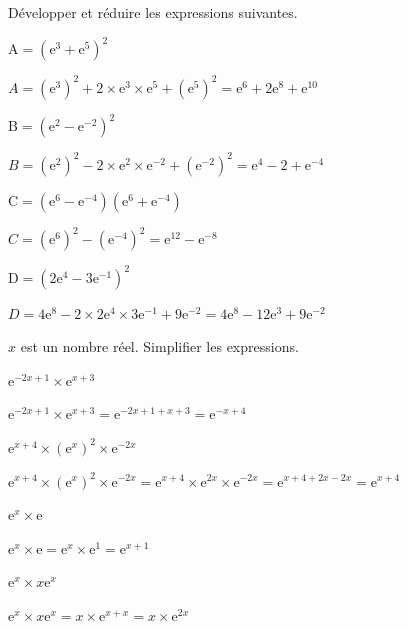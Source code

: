\documentclass[11pt,a4paper]{article}  %
\begin{document}
Développer et réduire les expressions suivantes.
\begin{enumMet}
	\item $\mathrm{A}=\left(\mathrm{e}^3+\mathrm{e}^5\right)^2$
	\begin{corrBox}
		$A=\left(\mathrm{e}^3\right)^2+2 \times \mathrm{e}^3 \times \mathrm{e}^5+\left(\mathrm{e}^5\right)^2=\mathrm{e}^6+2 \mathrm{e}^8+\mathrm{e}^{10}$
	\end{corrBox}
	\item $\mathrm{B}=\left(\mathrm{e}^2-\mathrm{e}^{-2}\right)^2$
	\begin{corrBox}
		$B=\left(\mathrm{e}^2\right)^2-2 \times \mathrm{e}^2 \times \mathrm{e}^{-2}+\left(\mathrm{e}^{-2}\right)^2=\mathrm{e}^4-2+\mathrm{e}^{-4}$
	\end{corrBox}
	\item  $\mathrm{C}=\left(\mathrm{e}^6-\mathrm{e}^{-4}\right)\left(\mathrm{e}^6+\mathrm{e}^{-4}\right)$
	\begin{corrBox}
		$C=\left(\mathrm{e}^6\right)^2-\left(\mathrm{e}^{-4}\right)^2=\mathrm{e}^{12}-\mathrm{e}^{-8}$
	\end{corrBox}
	\item $\mathrm{D}=\left(2 \mathrm{e}^4-3 \mathrm{e}^{-1}\right)^2$
	\begin{corrBox}
		$D=4 \mathrm{e}^8-2 \times 2 \mathrm{e}^4 \times 3 \mathrm{e}^{-1}+9 \mathrm{e}^{-2}=4 \mathrm{e}^8-12 \mathrm{e}^3+9 \mathrm{e}^{-2}$
	\end{corrBox}
\end{enumMet}


$x$ est un nombre réel. Simplifier les expressions.
\begin{enumMet}
	\item $\mathrm{e}^{-2 x+1} \times \mathrm{e}^{x+3}$
	\begin{corrBox}
		$\mathrm{e}^{-2 x+1} \times \mathrm{e}^{x+3}=\mathrm{e}^{-2 x+1+x+3}=\mathrm{e}^{-x+4}$		
	\end{corrBox}
	\item $\mathrm{e}^{x+4} \times\left(\mathrm{e}^x\right)^2 \times \mathrm{e}^{-2 x}$
	\begin{corrBox}
		$\mathrm{e}^{x+4} \times\left(\mathrm{e}^x\right)^2 \times \mathrm{e}^{-2 x}=\mathrm{e}^{x+4} \times \mathrm{e}^{2 x} \times \mathrm{e}^{-2 x}=\mathrm{e}^{x+4+2 x-2 x}=\mathrm{e}^{x+4}$		
	\end{corrBox}
	\item $\mathrm{e}^x \times \mathrm{e}$
	\begin{corrBox}
		$\mathrm{e}^x \times \mathrm{e}=\mathrm{e}^x \times \mathrm{e}^1=\mathrm{e}^{x+1}$		
	\end{corrBox}
	\item $\mathrm{e}^x \times x \mathrm{e}^x$
	\begin{corrBox}
		$\mathrm{e}^x \times x \mathrm{e}^x=x \times \mathrm{e}^{x+x}=x \times \mathrm{e}^{2 x}$		
	\end{corrBox}
\end{enumMet}
\end{document}
